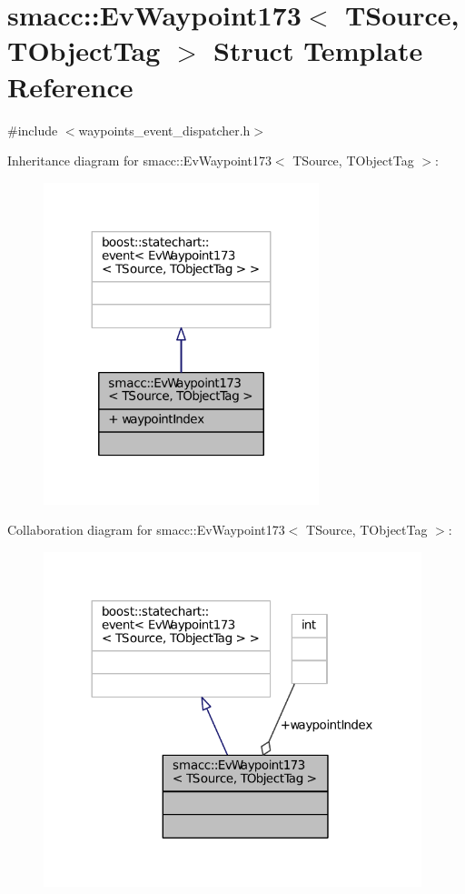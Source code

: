 \hypertarget{structsmacc_1_1EvWaypoint173}{}\section{smacc\+:\+:Ev\+Waypoint173$<$ T\+Source, T\+Object\+Tag $>$ Struct Template Reference}
\label{structsmacc_1_1EvWaypoint173}


{\ttfamily \#include $<$waypoints\+\_\+event\+\_\+dispatcher.\+h$>$}



Inheritance diagram for smacc\+:\+:Ev\+Waypoint173$<$ T\+Source, T\+Object\+Tag $>$\+:
\nopagebreak
\begin{figure}[H]
\begin{center}
\leavevmode
\includegraphics[width=227pt]{structsmacc_1_1EvWaypoint173__inherit__graph}
\end{center}
\end{figure}


Collaboration diagram for smacc\+:\+:Ev\+Waypoint173$<$ T\+Source, T\+Object\+Tag $>$\+:
\nopagebreak
\begin{figure}[H]
\begin{center}
\leavevmode
\includegraphics[width=312pt]{structsmacc_1_1EvWaypoint173__coll__graph}
\end{center}
\end{figure}
